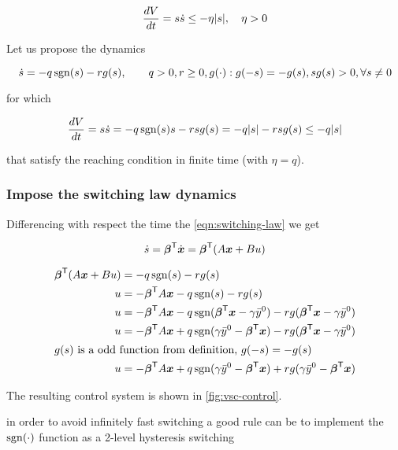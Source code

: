 \[
    \frac{d V}{d t} = s \dot s \leq - \eta |s|, \quad \eta > 0
\]

Let us propose the dynamics

\[
    \dot s = -q \operatorname{sgn}(s) - r g(s), \qquad q> 0, r \geq 0, g(\cdot) : g(-s)=-g(s), sg(s) > 0, \forall s \neq 0
\]

for which

\[
    \frac{d V}{d t} = s \dot s = -q \operatorname{sgn}(s) s - r s g(s) = -q |s| - r s g(s) \leq - q |s|
\]

that satisfy the reaching condition in finite time (with $\eta = q$).

\subsubsection{Impose the switching law dynamics}

Differencing with respect the time the \cref{eqn:switching-law} we get

\[
    \dot s = \boldsymbol{\beta}^{\mathsf{T}} \dot{\boldsymbol{x}} = \boldsymbol{\beta}^{\mathsf{T}} (A \boldsymbol{x} + B u)
\]

\begin{align*}
    \boldsymbol{\beta}^{\mathsf{T}} (A \boldsymbol{x} + B u) &= -q \operatorname{sgn}(s) - r g(s) \\
    u &= - \boldsymbol{\beta}^{\mathsf{T}} A \boldsymbol{x} -q \operatorname{sgn}(s) - r g(s) \\
    u &= - \boldsymbol{\beta}^{\mathsf{T}} A \boldsymbol{x} -q \operatorname{sgn}(\boldsymbol{\beta}^{\mathsf{T}} \boldsymbol{x} - \gamma \bar y^0) - r g(\boldsymbol{\beta}^{\mathsf{T}} \boldsymbol{x} - \gamma \bar y^0) \\
    u &= - \boldsymbol{\beta}^{\mathsf{T}} A \boldsymbol{x} + q \operatorname{sgn}(\gamma \bar y^0 - \boldsymbol{\beta}^{\mathsf{T}} \boldsymbol{x}) - r g(\boldsymbol{\beta}^{\mathsf{T}} \boldsymbol{x} - \gamma \bar y^0) \\
    \intertext{$g(s)$ is a odd function from definition, $g(-s)=-g(s)$}
    u &= - \boldsymbol{\beta}^{\mathsf{T}} A \boldsymbol{x} + q \operatorname{sgn}(\gamma \bar y^0 - \boldsymbol{\beta}^{\mathsf{T}} \boldsymbol{x}) + r g(\gamma \bar y^0 - \boldsymbol{\beta}^{\mathsf{T}} \boldsymbol{x})
\end{align*}

The resulting control system is shown in \cref{fig:vsc-control}.

\begin{nb}in order to avoid infinitely fast switching a good rule can be to implement the $\operatorname{sgn}(\cdot)$ function as a 2-level hysteresis switching\end{nb}

